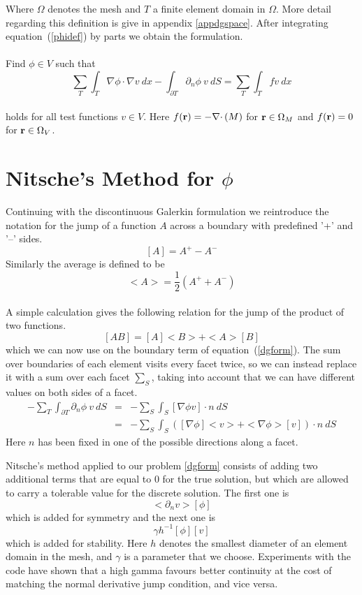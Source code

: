 \documentclass[12pt,a4paper,notitlepage]{article}
\begin{document}

\noindent Where $\Omega$ denotes the mesh and $T$ a finite element domain in $\Omega$. More detail regarding this
definition is give in appendix \ref{appdgspace}. After integrating
equation~(\ref{phidef}) by parts we obtain the formulation.
\\
\\
Find $\phi \in V$ such that
\begin{equation}\label{dgform}  
 \sum_T \int_T \nabla \phi \cdotp \nabla v \ dx - \int_{\partial T} \partial_n \phi \  v \ dS = \sum_T \int_T fv \ dx
\end{equation}
 \\
holds for all test functions $v \in V $. Here $f(\mathbf{r}) = - \nabla \cdotp (M)$ for $\mathbf{r} \in \Omega_M$ and $f(\mathbf{r}) = 0$
for $\mathbf{r} \in \Omega_V$.

\section{Nitsche's Method for $\phi$}
Continuing with the discontinuous Galerkin formulation we reintroduce the notation for the jump
of a function $A$ across a boundary with predefined '+' and '--' sides. 
\[ [A] = A^+ - A^- \]
Similarly the average is defined to be
\[ <A> = \frac{1}{2} (A^+ + A^-) \]
\\
A simple calculation gives the following relation for the jump of the product of two functions.
\[ [AB] = [A]<B> + <A>[B] \]
which we can now use on the boundary term of equation~(\ref{dgform}). The sum over boundaries of each element 
visits every facet twice, so we can instead replace it with a sum over each facet $\sum_S$, taking into account that
we can have different values on both sides of a facet. 
\begin{eqnarray*}
- \sum_T \int_{\partial T} \partial_n \phi \  v \ dS &=&  - \sum_S \int_S [\nabla \phi v ] \cdotp n \ dS \\
&=&  - \sum_S \int_S ( [\nabla \phi] <v> + <\nabla \phi> [v]) \cdotp n \ dS
\end{eqnarray*}
Here $n$ has been fixed in one of the possible directions along a facet. 

Nitsche's method applied to our problem \ref{dgform} consists of adding two additional terms that are equal to 0 
for the true solution, but which are allowed to carry a tolerable value for the discrete solution.
The first one is
\[ <\partial_n v> [\phi] \]
which is added for symmetry and the next one is
\[\gamma h^{-1} [\phi][v] \]
which is added for stability. Here $h$ denotes the smallest diameter of an element domain in the mesh, and
$\gamma$ is a parameter that we choose. Experiments with the code have shown that a high gamma favours better
continuity at the cost of matching the normal derivative jump condition, and vice versa.  
\end{document}
